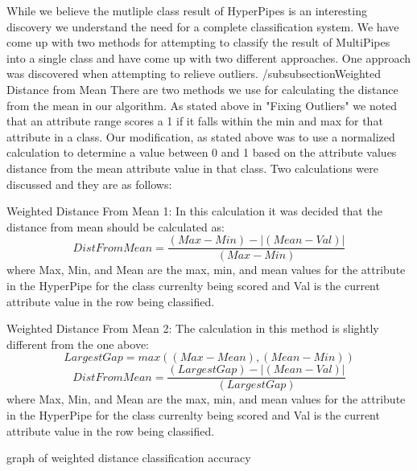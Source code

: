 While we believe the mutliple class result of HyperPipes is 
an interesting discovery we understand the need for a complete 
classification system. We have come up with two methods for
attempting to classify the result of MultiPipes into a single 
class and have come up with two different approaches. One 
approach was discovered when attempting to relieve outliers.
/subsubsection{Weighted Distance from Mean}
There are two methods we use for calculating the distance from 
the mean in our algorithm. As stated above in "Fixing Outliers" 
we noted that an attribute range scores a 1 if it falls within 
the min and max for that attribute in a class. Our modification, 
as stated above was to use a normalized calculation to determine 
a value between 0 and 1 based on the attribute values distance 
from the mean attribute value in that class. Two calculations 
were discussed and they are as follows:
\begin{enumeration}
\item Weighted Distance From Mean 1: In this calculation it was 
decided that the distance from mean should be calculated as:
\begin{equation}
  DistFromMean=\frac{(Max-Min)-|(Mean-Val)|}{(Max-Min)}
\end{equation}
where Max, Min, and Mean are the max, min, and mean values for 
the attribute in the HyperPipe for the class currenlty being 
scored and Val is the current attribute value in the row being 
classified. 
\item Weighted Distance From Mean 2: The calculation in this 
method is slightly different from the one above:
\begin{equation}
  LargestGap = max((Max-Mean),(Mean-Min))
\end{equation}
\begin{equation}
  DistFromMean=\frac{(LargestGap)-|(Mean-Val)|}{(LargestGap)}
\end{equation}
where Max, Min, and Mean are the max, min, and mean values for 
the attribute in the HyperPipe for the class currenlty being 
scored and Val is the current attribute value in the row being 
classified.
\end{enumeration}



graph of weighted distance classification accuracy

